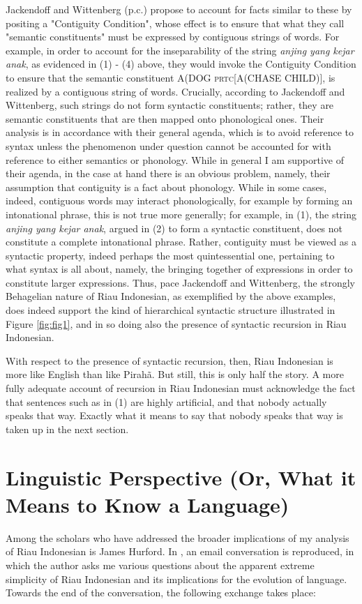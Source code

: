 \documentclass[output=paper,colorlinks,citecolor=brown
]{langscibook}
\begin{document}
Jackendoff and Wittenberg (p.c.) propose to account for facts similar to these by positing a "Contiguity Condition", whose effect is to ensure that what they call "semantic constituents" must be expressed by contiguous strings of words.  For example, in order to account for the inseparability of the string \emph{anjing yang kejar anak}, as evidenced in (1) - (4) above, they would invoke the Contiguity Condition to ensure that the semantic constituent A(DOG \textsc{prtc}[A(CHASE CHILD)], is realized by a contiguous string of words.  Crucially, according to Jackendoff and Wittenberg, such strings do not form syntactic constituents; rather, they are semantic constituents that are then mapped onto phonological ones.  Their analysis is in accordance with their general agenda, which is to avoid reference to syntax unless the phenomenon under question cannot be accounted for with reference to either semantics or phonology.  While in general I am supportive of their agenda, in the case at hand there is an obvious problem, namely, their assumption that contiguity is a fact about phonology.  While in some cases, indeed, contiguous words may interact phonologically, for example by forming an intonational phrase, this is not true more generally; for example, in (1), the string \emph{anjing yang kejar anak}, argued in (2) to form a syntactic constituent, does not constitute a complete intonational phrase.  Rather, contiguity must be viewed as a syntactic property, indeed perhaps the most quintessential one, pertaining to what syntax is all about, namely, the bringing together of expressions in order to constitute larger expressions.  Thus, pace Jackendoff and Wittenberg, the strongly Behagelian nature of Riau Indonesian, as exemplified by the above examples, does indeed support the kind of hierarchical syntactic structure illustrated in Figure \ref{fig:fig1}, and in so doing also the presence of syntactic recursion in Riau Indonesian.

With respect to the presence of syntactic recursion, then, Riau Indonesian is more like English than like Pirahã.  But still, this is only half the story.  A more fully adequate account of recursion in Riau Indonesian must acknowledge the fact that sentences such as in (1) are highly artificial, and that nobody actually speaks that way.  Exactly what it means to say that nobody speaks that way is taken up in the next section.

\section{Linguistic Perspective (Or, What it Means to Know a Language)}
Among the scholars who have addressed the broader implications of my analysis of Riau Indonesian is James Hurford. In \citet[410-413]{hurford2011origins}, an email conversation is reproduced, in which the author asks me various questions about the apparent extreme simplicity of Riau Indonesian and its implications for the evolution of language.  Towards the end of the conversation, the following exchange takes place:
\end{document}

